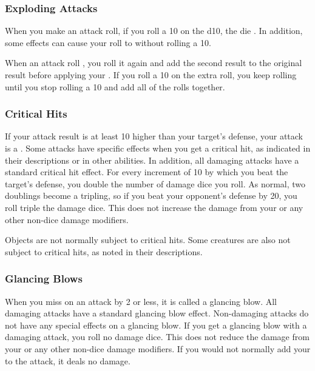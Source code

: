         \subsubsection{Exploding Attacks}\label{Exploding Attacks}
            When you make an attack roll, if you roll a 10 on the d10, the die .
            In addition, some effects can cause your roll to  without rolling a 10.

            When an attack roll , you roll it again and add the second result to the original result before applying your .
            If you roll a 10 on the extra roll, you keep rolling until you stop rolling a 10 and add all of the rolls together.

        \subsubsection{Critical Hits}\label{Critical Hits}
            If your attack result is at least 10 higher than your target's defense, your attack is a .
            Some attacks have specific effects when you get a critical hit, as indicated in their descriptions or in other abilities.
            In addition, all damaging attacks have a standard critical hit effect.
            For every increment of 10 by which you beat the target's defense, you double the number of damage dice you roll.
            As normal, two doublings become a tripling, so if you beat your opponent's defense by 20, you roll triple the damage dice.
            This does not increase the damage from your  or any other non-dice damage modifiers.

            Objects are not normally subject to critical hits.
            Some creatures are also not subject to critical hits, as noted in their descriptions.

        \subsubsection{Glancing Blows}\label{Glancing Blows}
            When you miss on an attack by 2 or less, it is called a glancing blow.
            All damaging attacks have a standard glancing blow effect.
            Non-damaging attacks do not have any special effects on a glancing blow.
            If you get a glancing blow with a damaging attack, you roll no damage dice.
            This does not reduce the damage from your  or any other non-dice damage modifiers.
            If you would not normally add your  to the attack, it deals no damage.

